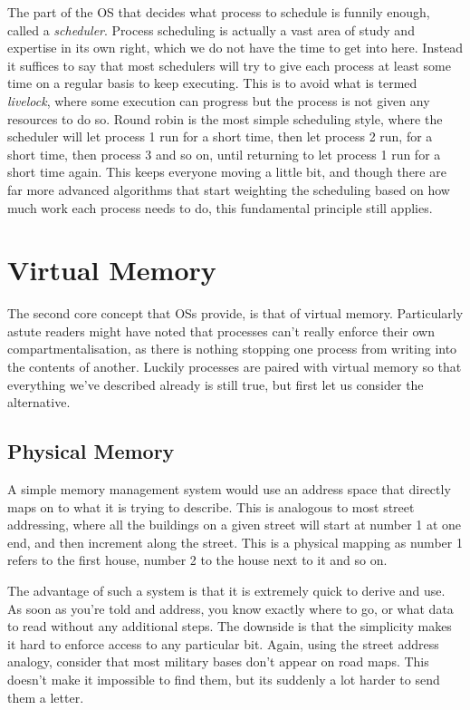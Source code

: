The part of the OS that decides what process to schedule is funnily enough, called a \textit{scheduler}. Process scheduling is actually a vast area of study and expertise in its own right, which we do not have the time to get into here. Instead it suffices to say that most schedulers will try to give each process at least some time on a regular basis to keep executing. This is to avoid what is termed \textit{livelock}, where some execution can progress but the process is not given any resources to do so. Round robin is the most simple scheduling style, where the scheduler will let process 1 run for a short time, then let process 2 run, for a short time, then process 3 and so on, until returning to let process 1 run for a short time again. This keeps everyone moving a little bit, and though there are far more advanced algorithms that start weighting the scheduling based on how much work each process needs to do, this fundamental principle still applies. 

\section{Virtual Memory}

The second core concept that OSs provide, is that of virtual memory. Particularly astute readers might have noted that processes can't really enforce their own compartmentalisation, as there is nothing stopping one process from writing into the contents of another. Luckily processes are paired with virtual memory so that everything we've described already is still true, but first let us consider the alternative.

\subsection{Physical Memory}

A simple memory management system would use an address space that directly maps on to what it is trying to describe. This is analogous to most street addressing, where all the buildings on a given street will start at number 1 at one end, and then increment along the street. This is a physical mapping as number 1 refers to the first house, number 2 to the house next to it and so on. 

The advantage of such a system is that it is extremely quick to derive and use. As soon as you're told and address, you know exactly where to go, or what data to read without any additional steps. The downside is that the simplicity makes it hard to enforce access to any particular bit. Again, using the street address analogy, consider that most military bases don't appear on road maps. This doesn't make it impossible to find them, but its suddenly a lot harder to send them a letter.

